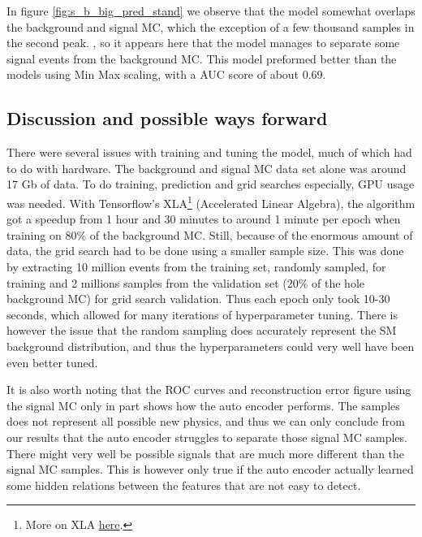 \documentclass[ reprint, amsmath,amssymb, aps, nofootinbib]{revtex4-2}
\begin{document}
In figure \ref{fig:s_b_big_pred_stand} we observe that the model somewhat overlaps the background and signal MC, which the exception of a few thousand samples in the second peak. , so it appears here that the model manages to separate some signal events from the background MC. This model preformed better than the models using Min Max scaling, with a AUC score of about 0.69. \par 

\subsection{Discussion and possible ways forward}
There were several issues with training and tuning the model, much of which had to do with hardware. The background and signal MC data set alone was around 17 Gb of data. To do training, prediction and grid searches especially, GPU usage was needed. With Tensorflow's XLA\footnote{More on XLA \href{https://www.tensorflow.org/xla}{here}.} (Accelerated Linear Algebra), the algorithm got a speedup from 1 hour and 30 minutes to around 1 minute per epoch when training on 80\% of the background MC. Still, because of the enormous amount of data, the grid search had to be done using a smaller sample size. This was done by extracting 10 million events from the training set, randomly sampled, for training and 2 millions samples from the validation set (20\% of the hole background MC) for grid search validation. Thus each epoch only took 10-30 seconds, which allowed for many iterations of hyperparameter tuning. There is however the issue that the random sampling does accurately represent the SM background distribution, and thus the hyperparameters could very well have been even better tuned.  \par \par
It is also worth noting that the ROC curves and reconstruction error figure using the signal MC only in part shows how the auto encoder performs. The samples does not represent all possible new physics, and thus we can only conclude from our results that the auto encoder struggles to separate those signal MC samples. There might very well be possible signals that are much more different than the signal MC samples. This is however only true if the auto encoder actually learned some hidden relations between the features that are not easy to detect. \par \par
\end{document}
